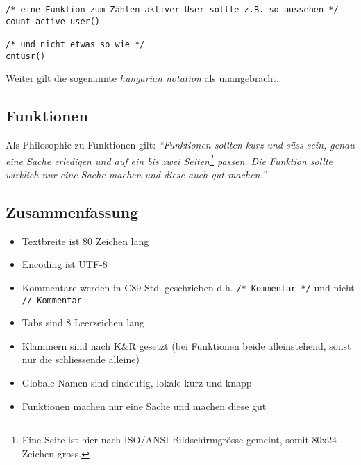 \begin{lstlisting}
/* eine Funktion zum Zählen aktiver User sollte z.B. so aussehen */
count_active_user()

/* und nicht etwas so wie */
cntusr()
\end{lstlisting}

Weiter gilt die sogenannte \emph{hungarian notation} als unangebracht.

\subsection{Funktionen}
Als Philosophie zu Funktionen gilt: \emph{``Funktionen sollten kurz und
süss sein, genau eine Sache erledigen und auf ein bis zwei 
Seiten\footnote{
    Eine Seite ist hier nach ISO/ANSI Bildschirmgrösse gemeint, somit 
    80x24 Zeichen gross.} passen. Die Funktion sollte wirklich nur eine 
Sache machen und diese auch gut machen.''}

\subsection{Zusammenfassung}
\begin{itemize}
    \item Textbreite ist 80 Zeichen lang
    \item Encoding ist UTF-8
    \item Kommentare werden in C89-Std. geschrieben 
          d.h. \verb?/* Kommentar */? und nicht \verb?// Kommentar?
    \item Tabs sind 8 Leerzeichen lang
    \item Klammern sind nach K\&R gesetzt (bei Funktionen beide 
          alleinstehend, sonst nur die schliessende alleine)
    \item Globale Namen sind eindeutig, lokale kurz und knapp
    \item Funktionen machen nur eine Sache und machen diese gut
\end{itemize}
